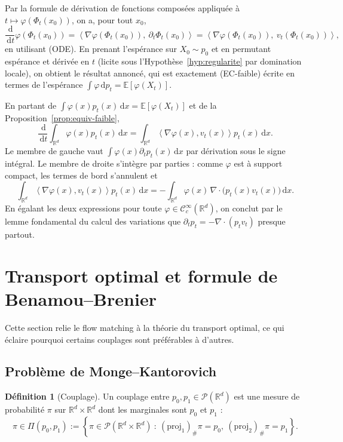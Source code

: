 \documentclass[11pt,a4paper]{article}
\makeatletter
\theoremstyle{definition}
\newtheorem{definition}{Définition}[section]
\theoremstyle{plain}
\theoremstyle{remark}
\providecommand{\demonstrationname}{Démonstration}
\renewenvironment{proof}[1][\demonstrationname]{\par
  \pushQED{\qed}%
  \normalfont \topsep6\p@\@plus6\p@\relax
  \trivlist
  \item[\hskip\labelsep
        \bfseries #1\@addpunct{.}]\ignorespaces
}{%
  \popQED\endtrivlist\@endpefalse
}
\newcommand{\R}{\mathbb{R}}
\newcommand{\E}{\mathbb{E}}
\newcommand{\dd}{\,\mathrm{d}}
\makeatother
\begin{document}
\begin{proof}
Par la formule de dérivation de fonctions composées appliquée à
$t\mapsto\varphi(\Phi_t(x_0))$, on a, pour tout $x_0$,
\[
  \frac{\dd}{\dd t}\varphi(\Phi_t(x_0))
  =
  \left\langle \nabla\varphi(\Phi_t(x_0)),\ \partial_t \Phi_t(x_0)\right\rangle
  =
  \left\langle \nabla\varphi(\Phi_t(x_0)),\ v_t(\Phi_t(x_0))\right\rangle,
\]
en utilisant (ODE). En prenant l'espérance sur $X_0\sim p_0$ et en permutant
espérance et dérivée en $t$ (licite sous l'Hypothèse~\ref{hyp:regularite} par
domination locale), on obtient le résultat annoncé, qui est exactement
(EC-faible) écrite en termes de l'espérance $\int\varphi\dd p_t=\E[\varphi(X_t)]$.
\end{proof}

\begin{proof}[Démonstration alternative]
En partant de $\int\varphi(x)p_t(x)\dd x=\E[\varphi(X_t)]$ et de la
Proposition~\ref{prop:equiv-faible},
\[
  \frac{\dd}{\dd t}\int_{\R^d}\varphi(x)p_t(x)\dd x
  =
  \int_{\R^d}\left\langle \nabla\varphi(x),v_t(x)\right\rangle p_t(x)\dd x.
\]
Le membre de gauche vaut $\int\varphi(x)\partial_t p_t(x)\dd x$ par dérivation
sous le signe intégral. Le membre de droite s'intègre par parties : comme
$\varphi$ est à support compact, les termes de bord s'annulent et
\[
  \int_{\R^d}\left\langle \nabla\varphi(x),v_t(x)\right\rangle p_t(x)\dd x
  =
  -\int_{\R^d}\varphi(x)\,\nabla\cdot\bigl(p_t(x)v_t(x)\bigr)\dd x.
\]
En égalant les deux expressions pour toute $\varphi\in\mathcal{C}_c^\infty(\R^d)$,
on conclut par le lemme fondamental du calcul des variations que
$\partial_t p_t=-\nabla\cdot(p_tv_t)$ presque partout.
\end{proof}

\section{Transport optimal et formule de Benamou--Brenier}

Cette section relie le flow matching à la théorie du transport optimal, ce qui
éclaire pourquoi certains couplages sont préférables à d'autres.

\subsection{Problème de Monge--Kantorovich}

\begin{definition}[Couplage]
Un couplage entre $p_0,p_1\in\mathcal{P}(\R^d)$ est une mesure de probabilité
$\pi$ sur $\R^d\times\R^d$ dont les marginales sont $p_0$ et $p_1$ :
\[
  \pi\in\Pi(p_0,p_1)
  :=
  \left\{\pi\in\mathcal{P}(\R^d\times\R^d)\ :\
  (\mathrm{proj}_1)_\#\pi=p_0,\ (\mathrm{proj}_2)_\#\pi=p_1\right\}.
\]
\end{definition}
\end{document}
